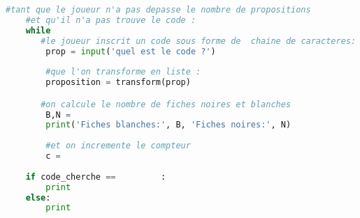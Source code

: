 \documentclass[a4paper, 11pt,reqno]{article}
\begin{document}
\begin{exercice}
\begin{enumerate}
\begin{lstlisting}[language =python]
    #tant que le joueur n'a pas depasse le nombre de propositions
    #et qu'il n'a pas trouve le code : 
    while
       #le joueur inscrit un code sous forme de  chaine de caracteres:
        prop = input('quel est le code ?') 
        
        #que l'on transforme en liste :
        proposition = transform(prop)

       #on calcule le nombre de fiches noires et blanches  
        B,N =
        print('Fiches blanches:', B, 'Fiches noires:', N)
        
        #et on incremente le compteur
        c =
    
    if code_cherche ==         :
        print 
    else:
        print 

\end{lstlisting}

\end{enumerate}



\end{exercice}
\end{document}
